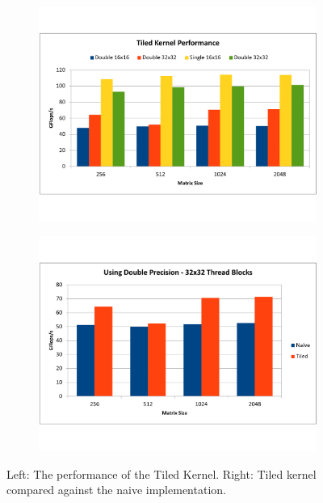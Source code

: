 \documentclass[paper=a4, fontsize=11pt]{scrartcl} %
\numberwithin{equation}{section} %
\numberwithin{figure}{section} %
\numberwithin{table}{section} %
\begin{document}
\begin{figure} [h]
\centering
\begin{subfigure}{.5\textwidth}
  \centering
  \includegraphics[width=\linewidth]{figures/tiled.pdf}
  \label{fig:tiled}
\end{subfigure}%
\begin{subfigure}{.5\textwidth}
  \centering
  \includegraphics[width=\linewidth]{figures/tiled_vs_naive.pdf}
  \label{fig:tiled_vs_naive}
\end{subfigure}
\caption{Left: The performance of the Tiled Kernel. Right: Tiled kernel compared against the naive implementation.}
\label{fig:multi3}
\end{figure}
\end{document}
